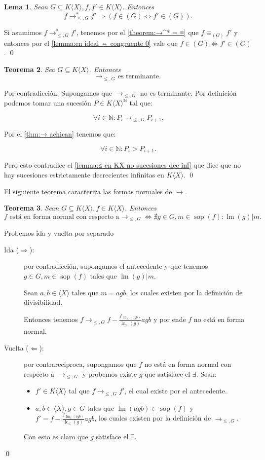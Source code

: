 \documentclass[12pt]{report}
\theoremstyle{customstyle}
\newtheorem{theorem}{Teorema}[chapter]
\newtheorem{lemma}[theorem]{Lema}
\renewenvironment{proof}[1][\proofname]{{\noindent \bfseries #1: }}{\qed} %
\theoremstyle{factstyle}
\DeclareMathOperator{\sop}{sop}
\DeclareMathOperator{\lm}{lm}
\DeclareMathOperator{\lc}{lc}
\begin{document}
\begin{lemma}\label{thm:→ mantiene pertenencia a ideal}
  Sean $G ⊆ K⟨X⟩, f, f' ∈ K⟨X⟩$. Entonces
  \[ f →^*_{≤, G} f' ⇒ (f ∈ (G) ⇔ f' ∈ (G)) \text{.}\]
\end{lemma}
\begin{proof}
  Si asumimos $f →^*_{≤, G} f'$, tenemos por el \cref{theorem:→^* = ≡} que $f ≡_{(G)} f'$ y entonces por el \cref{lemma:en ideal ⇔ congruente 0} vale que $f ∈ (G) ⇔ f' ∈ (G)$.
\end{proof}

\begin{theorem}
  Sea $G ⊆ K⟨X⟩$. Entonces
  \[ →_{≤, G} \text{ es terminante.} \]
\end{theorem}
\begin{proof}
  Por contradicción. Supongamos que $→_{≤, G}$ no es terminante. Por definición podemos tomar una sucesión $P ∈ K⟨X⟩^ℕ$ tal que:

  \[ ∀i ∈ ℕ : P_i →_{≤, G} P_{i+1}. \]

  \noindent Por el \cref{thm:→ achican} tenemos que:

  \[ ∀i ∈ ℕ : P_i > P_{i+1}. \]

  \noindent Pero esto contradice el \cref{lemma:≤ en KX no sucesiones dec inf} que dice que no hay sucesiones estrictamente decrecientes infinitas en $K⟨X⟩$.
\end{proof}

El siguiente teorema caracteriza las formas normales de $→$.

\begin{theorem}
  Sean $G ⊆ K⟨X⟩, f ∈ K⟨X⟩$. Entonces
  \[ f\text{ está en forma normal con respecto a} →_{≤, G} ⇔ ∄g ∈ G, m ∈ \sop(f) : \lm(g) | m \text{.}\]
\end{theorem}
\begin{proof} Probemos ida y vuelta por separado
  \begin{description}
    \item[Ida ($⇒$):] por contradicción, supongamos el antecedente y que tenemos $g ∈ G, m ∈ \sop(f)$ tales que $\lm(g) | m$.

    \noindent Sean $a, b ∈ ⟨X⟩$ tales que $m = agb$, los cuales existen por la definición de divisibilidad.

    \noindent Entonces tenemos $f →_{≤, G} f - \frac{f_{\lm_≤(agb)}}{\lc_≤(g)}agb$ y por ende $f$ no está en forma normal.

    \item[Vuelta ($⇐$):] por contrareciproca, supongamos que $f$ no está en forma normal con respecto a $→_{≤, G}$ y probemos existe $g$ que satisface el $∃$. Sean:
    \begin{itemize}
      \item $f' ∈ K⟨X⟩$ tal que $f →_{≤, G} f'$, el cual existe por el antecedente.
      \item $a, b ∈ ⟨X⟩, g ∈ G$ tales que $\lm(agb) ∈ \sop(f)$ y $f' = f - \frac{f_{\lm_≤(agb)}}{\lc_≤(g)}agb$, los cuales existen por la definición de $→_{≤, G}$.
    \end{itemize}

    Con esto es claro que $g$ satisface el $∃$.
  \end{description}
\end{proof}
\end{document}
